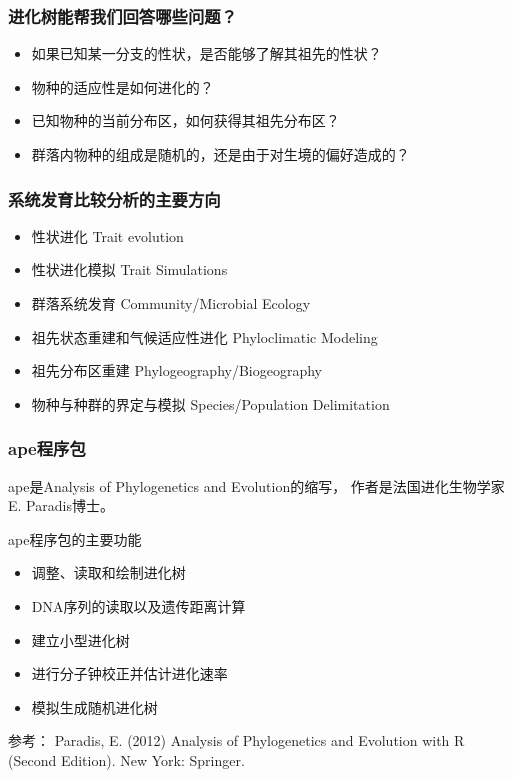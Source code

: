 \documentclass[UTF8]{ctexbeamer}
\begin{document}
        
        \begin{frame}
        \frametitle{进化树能帮我们回答哪些问题？}
        \begin{itemize}
        \item 如果已知某一分支的性状，是否能够了解其祖先的性状？
        \item 物种的适应性是如何进化的？
        \item 已知物种的当前分布区，如何获得其祖先分布区？
        \item 群落内物种的组成是随机的，还是由于对生境的偏好造成的？
        \end{itemize}
        \end{frame}
        
        \begin{frame}
        \frametitle{系统发育比较分析的主要方向}
        \begin{itemize}
        \item  性状进化 Trait evolution
        \item  性状进化模拟 Trait Simulations
        \item  群落系统发育 Community/Microbial Ecology
        \item  祖先状态重建和气候适应性进化 Phyloclimatic Modeling
        \item  祖先分布区重建 Phylogeography/Biogeography
        \item  物种与种群的界定与模拟 Species/Population Delimitation
        \end{itemize}
        \end{frame}
    
    \begin{frame}
    \frametitle{ape程序包}
    ape是Analysis of Phylogenetics and Evolution的缩写， 作者是法国进化生物学家E. Paradis博士。
    
    ape程序包的主要功能\\
    \begin{itemize}
    \item 调整、读取和绘制进化树
    \item DNA序列的读取以及遗传距离计算
    \item 建立小型进化树
    \item 进行分子钟校正并估计进化速率
    \item 模拟生成随机进化树
    \end{itemize}
    参考： Paradis, E. (2012) Analysis of Phylogenetics and Evolution with R (Second Edition). New York: Springer. 
    \end{frame}
    
\end{document}

